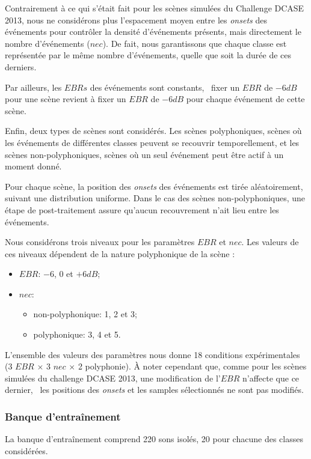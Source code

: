 Contrairement à ce qui s'était fait pour les scènes simulées du Challenge DCASE 2013, nous ne considérons plus l'espacement moyen entre les \emph{onsets} des événements pour contrôler la densité d'événements présents, mais directement le nombre d'événements ($nec$). De fait, nous garantissons que chaque classe est représentée par le même nombre d'événements, quelle que soit la durée de ces derniers.

Par ailleurs, les $EBRs$ des événements sont constants, \ie~fixer un $EBR$ de $-6dB$ pour une scène revient à fixer un $EBR$ de $-6dB$ pour chaque événement de cette scène.

Enfin, deux types de scènes sont considérés. Les scènes polyphoniques, scènes où les événements de différentes classes peuvent se recouvrir temporellement, et les scènes non-polyphoniques, scènes où un seul événement peut être actif à un moment donné.

Pour chaque scène, la position des \emph{onsets} des événements est tirée aléatoirement, suivant une distribution uniforme. Dans le cas des scènes non-polyphoniques, une étape de post-traitement assure qu'aucun recouvrement n'ait lieu entre les événements.

Nous considérons trois niveaux pour les paramètres $EBR$ et $nec$. Les valeurs de ces niveaux dépendent de la nature polyphonique de la scène :

\begin{itemize}
\item $EBR$: $-6$, $0$ et $+6dB$;
\item $nec$: 
\begin{itemize}
\item non-polyphonique: 1, 2 et 3;
\item polyphonique: 3, 4 et 5.
\end{itemize}
\end{itemize}

L'ensemble des valeurs des paramètres nous donne 18 conditions expérimentales (3 $EBR$ $\times$ 3 $nec$ $\times$ 2 polyphonie). À noter cependant que, comme pour les scènes simulées du challenge DCASE 2013, une modification de l'$EBR$ n'affecte que ce dernier, \ie~les positions des \emph{onsets} et les samples sélectionnés ne sont pas modifiés.

\subsubsection{Banque d'entraînement}

La banque d’entraînement comprend 220 sons isolés, 20 pour chacune des classes considérées.

